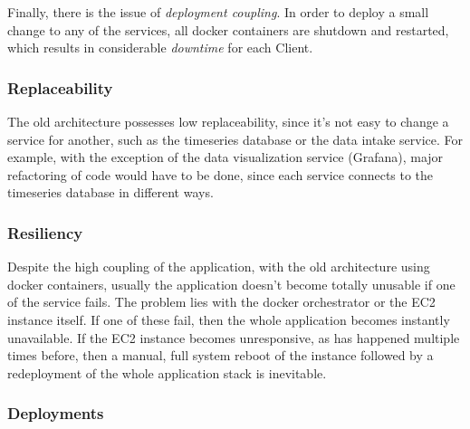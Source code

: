 Finally, there is the issue of \textit{deployment coupling}. In order to deploy a small change to any of the services, all docker containers are shutdown and restarted, which results in considerable \textit{downtime} for each Client.


\subsubsection{Replaceability}\label{methodology:sss:replaceability}

The old architecture possesses low replaceability, since it's not easy to change a service for another, such as the timeseries database or the data intake service. For example, with the exception of the data visualization service (Grafana), major refactoring of code would have to be done, since each service connects to the timeseries database in different ways.

\subsubsection{Resiliency}\label{methodology:sss:resiliency}

Despite the high coupling of the application, with the old architecture using docker containers, usually the application doesn't become totally unusable if one of the service fails. The problem lies with the docker orchestrator or the EC2 instance itself. If one of these fail, then the whole application becomes instantly unavailable. If the EC2 instance becomes unresponsive, as has happened multiple times before, then a manual, full system reboot of the instance followed by a redeployment of the whole application stack is inevitable. 

\subsubsection{Deployments}\label{methodology:sss:deployments}

